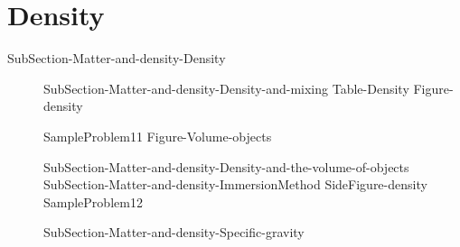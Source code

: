\documentclass[main.tex]{subfiles}
\newcommand\chapterlabel{Ch-measurements}\setcounter{figurenewcounter}{0}\setcounter{tablenewcounter}{0}\setcounter{formulanewcounter}{0}\chapterpicture{../{\chapterlabel}/figure1}\chapterpicturelabel{PngImg}
\begin{document}
\section{Density}
{SubSection-Matter-and-density-Density}
\sloppy\begin{description}
\item[]{SubSection-Matter-and-density-Density-and-mixing}
{Table-Density} 
{Figure-density} 

{SampleProblem11}%
{Figure-Volume-objects}
\item[]{SubSection-Matter-and-density-Density-and-the-volume-of-objects}
{SubSection-Matter-and-density-ImmersionMethod}
{SideFigure-density}
{SampleProblem12}%
\item[]{SubSection-Matter-and-density-Specific-gravity}

 
\end{description}


 \checkoddpage\ifoddpage \clearpage\thispagestyle{empty}\mbox{}\clearpage \else  \fi 
\end{document}
